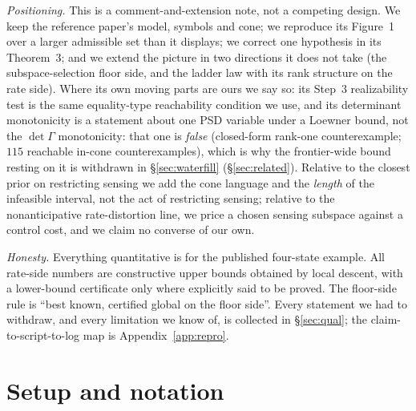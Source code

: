 \documentclass[journal]{IEEEtran}
\theoremstyle{remark}
\begin{document}
\emph{Positioning.} This is a comment-and-extension note, not a competing design.
We keep the reference paper's model, symbols and cone; we reproduce its
Figure~1 over a larger admissible set than it displays; we correct one hypothesis
in its Theorem~3; and we extend the picture in two directions it does not take
(the subspace-selection floor side, and the ladder law with its rank structure on
the rate side). Where its own moving parts are ours we say so: its Step~3
realizability test is the same equality-type reachability condition we use, and
its determinant monotonicity is a statement about one PSD variable under a Loewner
bound, not the $\det\Gamma$ monotonicity: that one is \emph{false} (closed-form
rank-one counterexample; $115$ reachable in-cone counterexamples), which is why
the frontier-wide bound resting on it is withdrawn in \S\ref{sec:waterfill}
(\S\ref{sec:related}). Relative to the closest prior on restricting sensing
\cite{cuvelier2021side} we add the cone language and the \emph{length} of the
infeasible interval, not the act of restricting sensing; relative to the
nonanticipative rate-distortion line, we price a chosen sensing subspace against a
control cost, and we claim no converse of our own.

\emph{Honesty.} Everything quantitative is for the published four-state example.
All rate-side numbers are constructive upper bounds obtained by local descent,
with a lower-bound certificate only where explicitly said to be proved. The
floor-side rule is ``best known, certified global on the floor side''. Every
statement we had to withdraw, and every limitation we know of, is collected in
\S\ref{sec:qual}; the claim-to-script-to-log map is Appendix~\ref{app:repro}.
\section{Setup and notation}
\label{sec:setup}
\end{document}
